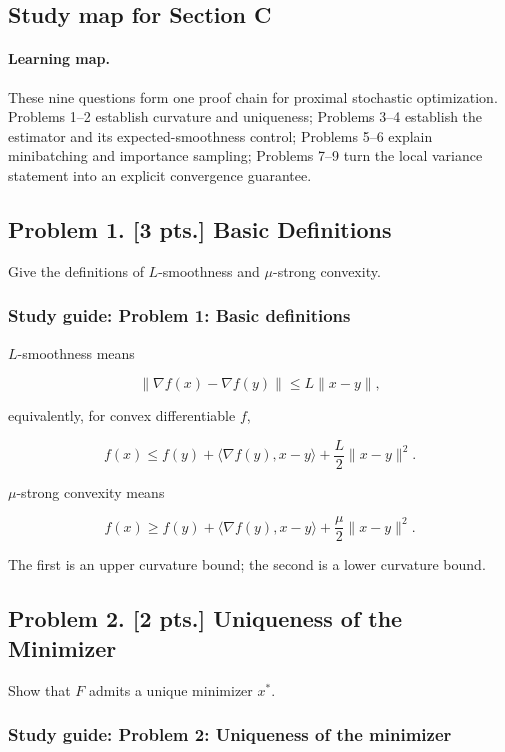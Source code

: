 \documentclass[11pt,a4paper]{article}
\begin{document}
\subsection{Study map for Section C}

\paragraph{Learning map.}

These nine questions form one proof chain for proximal stochastic optimization. Problems 1--2 establish curvature and uniqueness; Problems 3--4 establish the estimator and its expected-smoothness control; Problems 5--6 explain minibatching and importance sampling; Problems 7--9 turn the local variance statement into an explicit convergence guarantee.



\subsection{Problem 1. [3 pts.] Basic Definitions}
Give the definitions of $L$-smoothness and $\mu$-strong convexity.


\subsubsection{Study guide: Problem 1: Basic definitions}

$L$-smoothness means

\[
\|\nabla f(x)-\nabla f(y)\|\leq L\|x-y\|,
\]

equivalently, for convex differentiable $f$,

\[
f(x)\leq f(y)+\langle\nabla f(y),x-y\rangle+\frac{L}{2}\|x-y\|^2.
\]

$\mu$-strong convexity means

\[
f(x)\geq f(y)+\langle\nabla f(y),x-y\rangle+\frac{\mu}{2}\|x-y\|^2.
\]

The first is an upper curvature bound; the second is a lower curvature bound.



\subsection{Problem 2. [2 pts.] Uniqueness of the Minimizer}
Show that $F$ admits a unique minimizer $x^{*}$.


\subsubsection{Study guide: Problem 2: Uniqueness of the minimizer}
\end{document}
